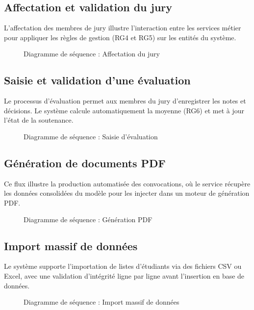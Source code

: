 \documentclass[12pt,a4paper]{article}
\begin{document}
\subsection{Affectation et validation du jury}
L'affectation des membres de jury illustre l'interaction entre les services métier pour appliquer les règles de gestion (RG4 et RG5) sur les entités du système.

\begin{figure}[H]
    \centering
    \caption{Diagramme de séquence : Affectation du jury}
\end{figure}

\subsection{Saisie et validation d'une évaluation}
Le processus d'évaluation permet aux membres du jury d'enregistrer les notes et décisions. Le système calcule automatiquement la moyenne (RG6) et met à jour l'état de la soutenance.

\begin{figure}[H]
    \centering
    \caption{Diagramme de séquence : Saisie d'évaluation}
\end{figure}

\subsection{Génération de documents PDF}
Ce flux illustre la production automatisée des convocations, où le service récupère les données consolidées du modèle pour les injecter dans un moteur de génération PDF.

\begin{figure}[H]
    \centering
    \caption{Diagramme de séquence : Génération PDF}
\end{figure}

\subsection{Import massif de données}
Le système supporte l'importation de listes d'étudiants via des fichiers CSV ou Excel, avec une validation d'intégrité ligne par ligne avant l'insertion en base de données.

\begin{figure}[H]
    \centering
    \caption{Diagramme de séquence : Import massif de données}
\end{figure}
\end{document}
